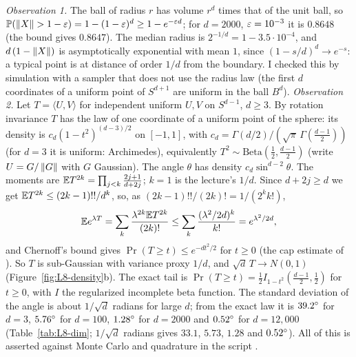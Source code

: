 \begin{beyond}\label{box:L8-proofs}
\emph{Observation 1.} The ball of radius $r$ has volume $r^d$ times that of the unit ball, so $\mathbb{P}(\left\lVert X\right\rVert>1-\varepsilon)=1-(1-\varepsilon)^d\ge1-e^{-\varepsilon d}$; for $d=2000$, $\varepsilon=10^{-3}$ it is $0.8648$ (the bound gives $0.8647$). The median radius is $2^{-1/d}=1-3.5\cdot10^{-4}$, and $d\,(1-\left\lVert X\right\rVert)$ is asymptotically exponential with mean $1$, since $(1-s/d)^d\to e^{-s}$: a typical point is at distance of order $1/d$ from the boundary. I checked this by simulation with a sampler that does not use the radius law (the first $d$ coordinates of a uniform point of $S^{d+1}$ are uniform in the ball $B^d$).
\emph{Observation 2.} Let $T=\langle U,V\rangle$ for independent uniform $U,V$ on $S^{d-1}$, $d\ge3$. By rotation invariance $T$ has the law of one coordinate of a uniform point of the sphere: its density is $c_d(1-t^2)^{(d-3)/2}$ on $[-1,1]$, with $c_d=\Gamma(d/2)/(\sqrt\pi\,\Gamma(\frac{d-1}2))$ (for $d=3$ it is uniform: Archimedes), equivalently $T^2\sim\mathrm{Beta}(\tfrac12,\tfrac{d-1}2)$ (write $U=G/\left\lVert G\right\rVert$ with $G$ Gaussian). The angle $\theta$ has density $c_d\sin^{d-2}\theta$. The moments are $\mathbb{E} T^{2k}=\prod_{j<k}\frac{2j+1}{d+2j}$; $k=1$ is the lecture's $1/d$. Since $d+2j\ge d$ we get $\mathbb{E} T^{2k}\le(2k-1)!!/d^k$, so, as $(2k-1)!!/(2k)!=1/(2^kk!)$,
\[
   \mathbb{E} e^{\lambda T}=\sum_k\frac{\lambda^{2k}\mathbb{E} T^{2k}}{(2k)!}\le\sum_k\frac{(\lambda^2/2d)^k}{k!}=e^{\lambda^2/2d},
\]
and Chernoff's bound gives $\Pr(T\ge t)\le e^{-dt^2/2}$ for $t\ge0$ (the cap estimate of \citealp[Lemma~2.2]{ball1997}). So $T$ is sub-Gaussian with variance proxy $1/d$, and $\sqrt d\,T\to N(0,1)$ (Figure~\ref{fig:L8-density}b). The exact tail is $\Pr(T\ge t)=\tfrac12I_{1-t^2}(\frac{d-1}2,\frac12)$ for $t\ge0$, with $I$ the regularized incomplete beta function. The standard deviation of the angle is about $1/\sqrt d$ radians for large $d$; from the exact law it is $39.2^{\circ}$ for $d=3$, $5.76^{\circ}$ for $d=100$, $1.28^{\circ}$ for $d=2000$ and $0.52^{\circ}$ for $d=12{,}000$ (Table~\ref{tab:L8-dim}; $1/\sqrt d$ radians gives $33.1$, $5.73$, $1.28$ and $0.52^{\circ}$). All of this is asserted against Monte Carlo and quadrature in the script .
\end{beyond}

